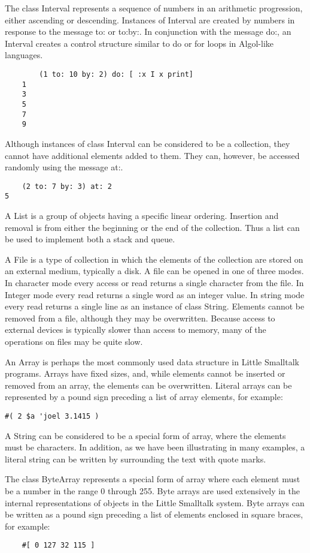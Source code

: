 The class Interval represents a sequence of numbers in an arithmetic
progression, either ascending or descending. Instances of Interval are
created by numbers in response to the message to: or to:by:. In conjunction
with the message do:, an Interval creates a control structure similar to do
or for loops in Algol-like languages.
\begin{lstlisting}
        (1 to: 10 by: 2) do: [ :x I x print]
    1
    3
    5
    7
    9
\end{lstlisting}
Although instances of class Interval can be considered to be a collection,
they cannot have additional elements added to them. They can, however,
be accessed randomly using the message at:.
\begin{lstlisting}
    (2 to: 7 by: 3) at: 2
5
\end{lstlisting}

A List is a group of objects having a specific linear ordering. Insertion
and removal is from either the beginning or the end of the collection. Thus
a list can be used to implement both a stack and queue.

A File is a type of collection in which the elements of the collection
are stored on an external medium, typically a disk. A file can be opened
in one of three modes. In character mode every access or read returns a
single character from the file. In Integer mode every read returns a single
word as an integer value. In string mode every read returns a single line
as an instance of class String. Elements cannot be removed from a file,
although they may be overwritten. Because access to external devices is
typically slower than access to memory, many of the operations on files
may be quite slow.

An Array is perhaps the most commonly used data structure in Little
Smalltalk programs. Arrays have fixed sizes, and, while elements cannot
be inserted or removed from an array, the elements can be overwritten.
Literal arrays can be represented by a pound sign preceding a list of array
elements, for example:
\begin{lstlisting}
#( 2 $a 'joel 3.1415 )
\end{lstlisting}

A String can be considered to be a special form of array, where the
elements must be characters. In addition, as we have been illustrating in
many examples, a literal string can be written by surrounding the text with
quote marks.

The class ByteArray represents a special form of array where each
element must be a number in the range 0 through 255. Byte arrays are
used extensively in the internal representations of objects in the Little
Smalltalk system. Byte arrays can be written as a pound sign preceding a
list of elements enclosed in square braces, for example:
\begin{lstlisting}
    #[ 0 127 32 115 ]
\end{lstlisting}

